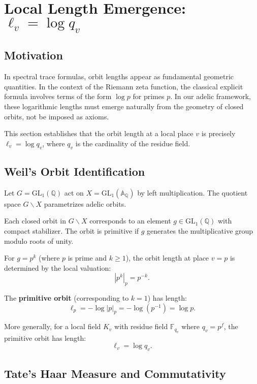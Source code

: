 \section{Local Length Emergence: $\ell_v = \log q_v$}

\subsection{Motivation}

In spectral trace formulas, orbit lengths appear as fundamental geometric quantities. In the context of the Riemann zeta function, the classical explicit formula involves terms of the form $\log p$ for primes $p$. In our adelic framework, these logarithmic lengths must emerge naturally from the geometry of closed orbits, not be imposed as axioms.

This section establishes that the orbit length at a local place $v$ is precisely $\ell_v = \log q_v$, where $q_v$ is the cardinality of the residue field.

\subsection{Weil's Orbit Identification}

Let $G = \text{GL}_1(\mathbb{Q})$ act on $X = \text{GL}_1(\mathbb{A}_\mathbb{Q})$ by left multiplication. The quotient space $G \backslash X$ parametrizes adelic orbits. 

\begin{lemma}
Each closed orbit in $G \backslash X$ corresponds to an element $g \in \text{GL}_1(\mathbb{Q})$ with compact stabilizer. The orbit is primitive if $g$ generates the multiplicative group modulo roots of unity.
\end{lemma}

For $g = p^k$ (where $p$ is prime and $k \geq 1$), the orbit length at place $v = p$ is determined by the local valuation:
\[
|p^k|_p = p^{-k}.
\]

The \textbf{primitive orbit} (corresponding to $k=1$) has length:
\[
\ell_p = -\log|p|_p = -\log(p^{-1}) = \log p.
\]

More generally, for a local field $K_v$ with residue field $\mathbb{F}_{q_v}$ where $q_v = p^f$, the primitive orbit has length:
\[
\ell_v = \log q_v.
\]

\subsection{Tate's Haar Measure and Commutativity}

